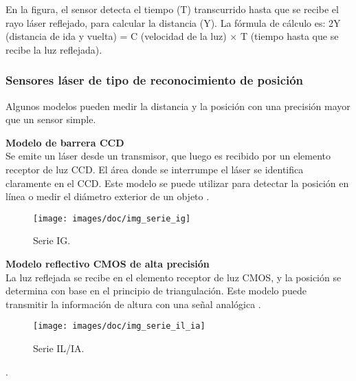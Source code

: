 En la figura, el sensor detecta el tiempo (T) transcurrido hasta que se recibe 
el rayo láser reflejado, para calcular la distancia (Y). La fórmula de cálculo 
es: 2Y (distancia de ida y vuelta) = C (velocidad de la luz) × T (tiempo hasta 
que se recibe la luz reflejada).

\subsubsection{Sensores láser de tipo de reconocimiento de posición}
\label{sec:sensores:l:recog_posicion}

Algunos modelos pueden medir la distancia y la posición con una precisión mayor 
que un sensor simple.

\textbf{Modelo de barrera CCD} \\
Se emite un láser desde un transmisor, que luego es recibido por un elemento 
receptor de luz CCD. El área donde se interrumpe el láser se identifica 
claramente en el CCD. Este modelo se puede utilizar para detectar la posición en 
línea o medir el diámetro exterior de un objeto 
\cite{sensores:proximidad:clasificacion:principios}.

\begin{figure}[H]
	\begin{center}
		\texttt{[image: images/doc/img\_serie\_ig]}
		\caption{Serie IG.}
	\end{center}
\end{figure}

\textbf{Modelo reflectivo CMOS de alta precisión} \\
La luz reflejada se recibe en el elemento receptor de luz CMOS, y la posición se 
determina con base en el principio de triangulación. Este modelo puede 
transmitir la información de altura con una señal analógica 
\cite{sensores:proximidad:clasificacion:principios}.

\begin{figure}[H]
	\begin{center}
		\texttt{[image: images/doc/img\_serie\_il\_ia]}
		\caption{Serie IL/IA.}
	\end{center}
\end{figure}

. 
\\ \\
